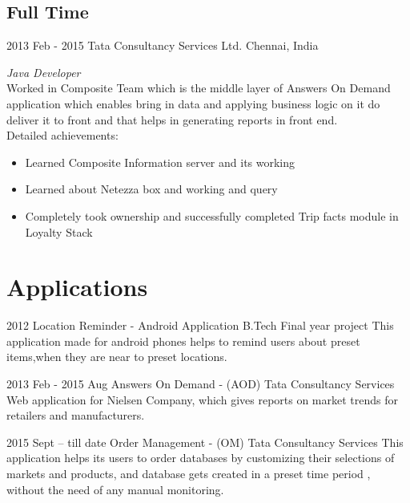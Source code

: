 \documentclass[]{lalet-cv}
\begin{document}
\subsection{Full Time}

\begin{entrylist}


\entry
{2013 Feb - 2015 \enspace}
{Tata Consultancy Services Ltd.}
{Chennai, India}
{\emph{Java Developer} \\
Worked in Composite Team which is the middle layer of Answers On Demand application which enables bring in
data and applying business logic on it do deliver it to front and that helps in generating reports in
front end. \\
Detailed achievements:
\begin{itemize}
\item Learned Composite Information server and its working
\item Learned about Netezza box and working and query 
\item Completely took ownership and successfully completed Trip facts module in Loyalty Stack
\end{itemize}}


\end{entrylist}

\section{Applications}

\begin{entrylist}
  \entry
  {2012}
  {Location Reminder - Android Application}
  {B.Tech Final year project}
  {This application made for android phones helps to remind 
  users about preset items,when they are near to preset locations.}  

  \entry
  {2013 Feb - 2015 Aug \enspace}
  {Answers On Demand - (AOD)}
  {Tata Consultancy Services}
  {Web application for Nielsen Company, which gives reports 
  on market trends for retailers and manufacturers.}  

  \entry
  {2015 Sept -- till date \enspace}
  {Order Management - (OM)}
  {Tata Consultancy Services}
  {This application helps its users to order databases by 
  customizing their selections of markets and products,
  and database gets created in a preset time period , without 
  the need of any manual monitoring.}   
   
\end{entrylist}
\pagebreak
\end{document}

